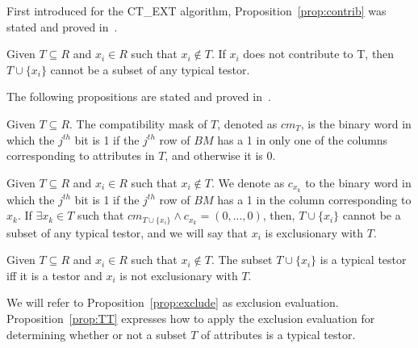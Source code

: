 \documentclass[citenumber]{llncs}
\begin{document}
	First introduced for the CT\_EXT algorithm, Proposition~\ref{prop:contrib} was stated and proved in~\cite{Sanchez10}.
	
	\begin{proposition}\label{prop:contrib} 
		Given $T \subseteq R$ and  $x_i \in R$ such that $x_i \notin T$. If $x_i$ does not contribute to T, then $T\cup\{x_i\}$ cannot be a subset of any typical testor.
	\end{proposition}
	

	The following propositions are stated and proved in~\cite{Lias13}.
	
	\begin{definition}\label{def:exclusion}
		Given $T \subseteq R$. The compatibility mask of $T$, denoted as $cm_T$, is the binary word in which the $j^{\mathit{th}}$ bit is 1 if the $j^{\mathit{th}}$ row of $BM$ has a 1 in only one of the columns corresponding to attributes in $T$, and otherwise it is 0.
	\end{definition}
	
	\begin{proposition}\label{prop:exclude} 
		Given $T \subseteq R$ and $x_i \in R$ such that $x_i \notin T$.	We denote as $c_{x_k}$ to the binary word in which the $j^{\mathit{th}}$ bit is 1 if the $j^{\mathit{th}}$ row of $BM$ has a 1 in the column corresponding to $x_k$. If $\exists x_k \in T$ such that $cm_{T \cup \lbrace x_i\rbrace} \wedge c_{x_k}=(0,...,0)$, then, $T \cup \lbrace x_i\rbrace$ cannot be a subset of any typical testor, and we will say that $x_i$ is exclusionary with $T$.
	\end{proposition}
	
	\begin{proposition}\label{prop:TT} 
		Given $T \subseteq R$ and $x_i \in R$ such that $x_i \notin T$. The subset $T \cup \lbrace x_i\rbrace$ is a typical testor iff it is a testor and $x_i$ is not exclusionary with $T$.
	\end{proposition}

	We will refer to Proposition~\ref{prop:exclude} as exclusion evaluation. Proposition~\ref{prop:TT} expresses how to apply the exclusion evaluation for determining whether or not a subset $T$ of attributes is a typical testor.
	
\end{document}
